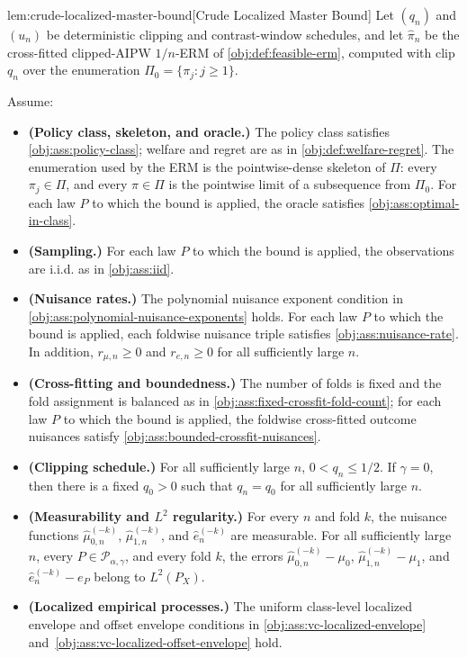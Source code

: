 \begin{lemmav}{lem:crude-localized-master-bound}[Crude Localized Master Bound]
Let \((q_n)\) and \((u_n)\) be deterministic clipping and contrast-window schedules, and let \(\widehat\pi_n\) be the cross-fitted clipped-AIPW \(1/n\)-ERM of \cref{obj:def:feasible-erm}, computed with clip \(q_n\) over the enumeration \(\Pi_0=\{\pi_j:j\ge1\}\).

Assume:
\begin{itemize}
\item \textbf{(Policy class, skeleton, and oracle.)} The policy class satisfies \cref{obj:ass:policy-class}; welfare and regret are as in \cref{obj:def:welfare-regret}. The enumeration used by the ERM is the pointwise-dense skeleton of \(\Pi\): every \(\pi_j\in\Pi\), and every \(\pi\in\Pi\) is the pointwise limit of a subsequence from \(\Pi_0\). For each law \(P\) to which the bound is applied, the oracle satisfies \cref{obj:ass:optimal-in-class}.
\item \textbf{(Sampling.)} For each law \(P\) to which the bound is applied, the observations are i.i.d. as in \cref{obj:ass:iid}.
\item \textbf{(Nuisance rates.)} The polynomial nuisance exponent condition in \cref{obj:ass:polynomial-nuisance-exponents} holds. For each law \(P\) to which the bound is applied, each foldwise nuisance triple satisfies \cref{obj:ass:nuisance-rate}. In addition, \(r_{\mu,n}\ge0\) and \(r_{e,n}\ge0\) for all sufficiently large \(n\).
\item \textbf{(Cross-fitting and boundedness.)} The number of folds is fixed and the fold assignment is balanced as in \cref{obj:ass:fixed-crossfit-fold-count}; for each law \(P\) to which the bound is applied, the foldwise cross-fitted outcome nuisances satisfy \cref{obj:ass:bounded-crossfit-nuisances}.
\item \textbf{(Clipping schedule.)} For all sufficiently large \(n\), \(0<q_n\le 1/2\). If \(\gamma=0\), then there is a fixed \(q_0>0\) such that \(q_n=q_0\) for all sufficiently large \(n\).
\item \textbf{(Measurability and \(L^2\) regularity.)} For every \(n\) and fold \(k\), the nuisance functions \(\widehat\mu_{0,n}^{(-k)}\), \(\widehat\mu_{1,n}^{(-k)}\), and \(\widehat e_n^{(-k)}\) are measurable. For all sufficiently large \(n\), every \(P\in\mathcal P_{\alpha,\gamma}\), and every fold \(k\), the errors \(\widehat\mu_{0,n}^{(-k)}-\mu_0\), \(\widehat\mu_{1,n}^{(-k)}-\mu_1\), and \(\widehat e_n^{(-k)}-e_P\) belong to \(L^2(P_X)\).
\item \textbf{(Localized empirical processes.)} The uniform class-level localized envelope and offset envelope conditions in \cref{obj:ass:vc-localized-envelope} and~\cref{obj:ass:vc-localized-offset-envelope} hold.
\end{itemize}


\end{lemmav}
